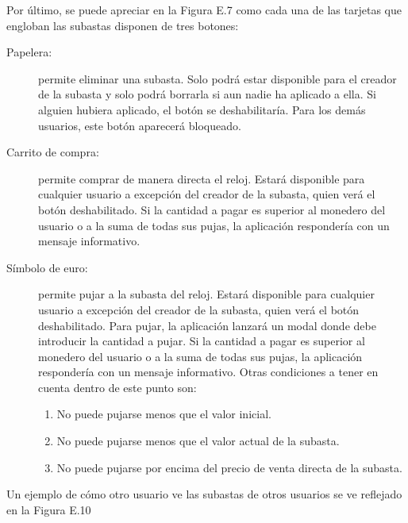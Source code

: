 	Por último, se puede apreciar en la Figura E.7 como cada una de las tarjetas que engloban las subastas disponen de tres botones:
	\begin{description}
		\item [Papelera:] permite eliminar una subasta. Solo podrá estar disponible para el creador de la subasta y solo podrá borrarla si aun nadie ha aplicado a ella. Si alguien hubiera aplicado, el botón se deshabilitaría. Para los demás usuarios, este botón aparecerá bloqueado.
		\item [Carrito de compra:] permite comprar de manera directa el reloj. Estará disponible para cualquier usuario a excepción del creador de la subasta, quien verá el botón deshabilitado. Si la cantidad a pagar es superior al monedero del usuario o a la suma de todas sus pujas, la aplicación respondería con un mensaje informativo.
		\item [Símbolo de euro:] permite pujar a la subasta del reloj. Estará disponible para cualquier usuario a excepción del creador de la subasta, quien verá el botón deshabilitado. Para pujar, la aplicación lanzará un modal donde debe introducir la cantidad a pujar. Si la cantidad a pagar es superior al monedero del usuario o a la suma de todas sus pujas, la aplicación respondería con un mensaje informativo. Otras condiciones a tener en cuenta dentro de este punto son:
		\begin{enumerate}
			\item No puede pujarse menos que el valor inicial.
			\item No puede pujarse menos que el valor actual de la subasta.
			\item No puede pujarse por encima del precio de venta directa de la subasta.
		\end{enumerate}
	\end{description}
	
	Un ejemplo de cómo otro usuario ve las subastas de otros usuarios se ve reflejado en la Figura E.10
	



